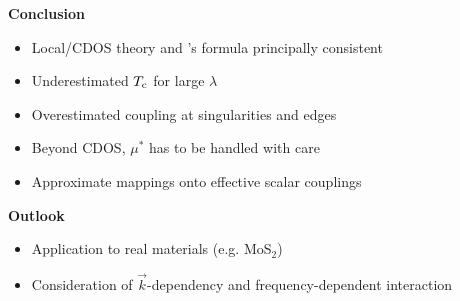 \documentclass[10pt]{beamer}
\def\cmark{\ding{51}}
\def\xmark{\ding{55}}
\begin{document}
    \begin{frame}[label=conclusion]
        \begin{center}
            \color{titleblue} \bf \Large
            Conclusion
        \end{center}

        \begin{itemize}
            \item[\cmark] Local/CDOS  theory and
                          's formula principally consistent
            \medskip
            \item[\xmark] Underestimated $T \sb{\text{c}}$ for large $\lambda$
            \item[\xmark] Overestimated coupling at 
                          singularities and edges
            \item[\xmark] Beyond CDOS, $\mu^*$ has to be handled with care
            \medskip
            \item[\cmark] Approximate mappings onto effective scalar couplings
        \end{itemize}

        \medskip

        \begin{center}
            \color{titleblue} \bf \Large
            Outlook
        \end{center}

        \begin{itemize}
            \item Application to real materials (e.g. MoS$_2$)
            \item Consideration of $\vec k$-dependency and frequency-dependent
                   interaction
        \end{itemize}
    \end{frame}
\end{document}
